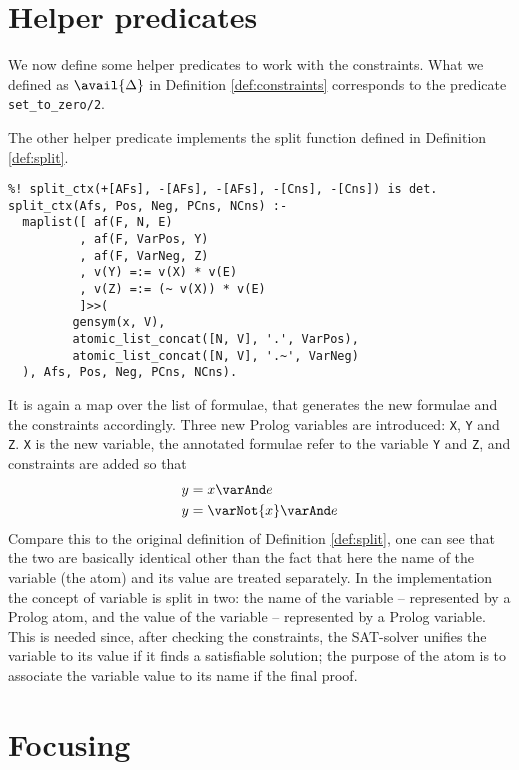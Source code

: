 \section{Helper predicates}\label{sec:helper}
We now define some helper predicates to work with the constraints.
What we defined as $\avail{\Delta}$ in Definition \ref{def:constraints} corresponds to the predicate \texttt{set\_to\_zero/2}.

The other helper predicate implements the split function defined in Definition \ref{def:split}.
\begin{verbatim}
%! split_ctx(+[AFs], -[AFs], -[AFs], -[Cns], -[Cns]) is det.
split_ctx(Afs, Pos, Neg, PCns, NCns) :-
  maplist([ af(F, N, E)
          , af(F, VarPos, Y)
          , af(F, VarNeg, Z)
          , v(Y) =:= v(X) * v(E)
          , v(Z) =:= (~ v(X)) * v(E)
          ]>>(
  	     gensym(x, V),
  	     atomic_list_concat([N, V], '.', VarPos),
  	     atomic_list_concat([N, V], '.~', VarNeg)
  ), Afs, Pos, Neg, PCns, NCns).
\end{verbatim}
It is again a map over the list of formulae, that generates the new formulae and the constraints accordingly.
Three new Prolog variables are introduced: \texttt{X}, \texttt{Y} and \texttt{Z}.
\texttt{X} is the new variable, the annotated formulae refer to the variable \texttt{Y} and \texttt{Z}, and constraints are added so that
\begin{align*}
	y &= x \varAnd e \\
	y &= \varNot{x} \varAnd e
\end{align*}
Compare this to the original definition of Definition \ref{def:split}, one can see that the two are basically identical other than the fact that here the name of the variable (the atom) and its value are treated separately.
In the implementation the concept of variable is split in two: the name of the variable -- represented by a Prolog atom, and the value of the variable -- represented by a Prolog variable.
This is needed since, after checking the constraints, the SAT-solver unifies the variable to its value if it finds a satisfiable solution; the purpose of the atom is to associate the variable value to its name if the final proof.

\section{Focusing}\label{sec:focusing-impl}
